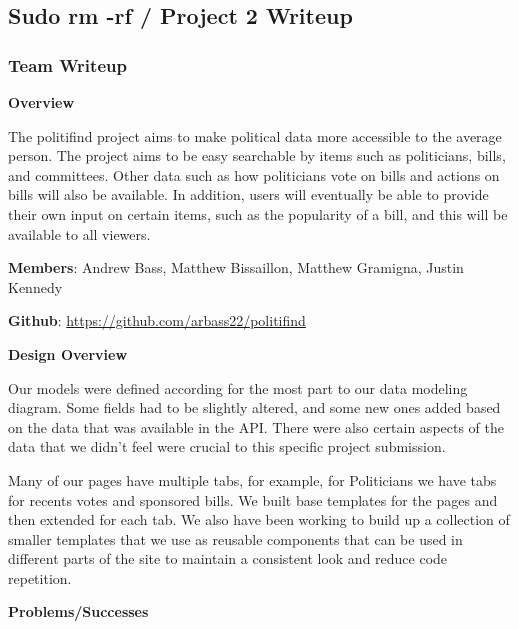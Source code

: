 \documentclass{article}
\newcommand{\n}{\noindent}
\begin{document}
\begin{center}
\subsection*{Sudo rm -rf / Project 2 Writeup}
\end{center}

\subsubsection*{Team Writeup}

\textbf{Overview}

The politifind project aims to make political data more accessible to the average person. The project aims to be easy searchable by items such as politicians, bills, and committees. Other data such as how politicians vote on bills and actions on bills will also be available. In addition, users will eventually be able to provide their own input on certain items, such as the popularity of a bill, and this will be available to all viewers.

\n\textbf{Members}: Andrew Bass, Matthew Bissaillon, Matthew Gramigna, Justin Kennedy

\n\textbf{Github}: \url{https://github.com/arbass22/politifind}

\n\textbf{Design Overview}

Our models were defined according for the most part to our data modeling diagram. Some fields had to be slightly altered, and some new ones added based on the data that was available in the API. There were also certain aspects of the data that we didn't feel were crucial to this specific project submission.

Many of our pages have multiple tabs, for example, for Politicians we have tabs for recents votes and sponsored bills.  We built base templates for the pages and then extended for each tab.  We also have been working to build up a collection of smaller templates that we use as reusable components that can be used in different parts of the site to maintain a consistent look and reduce code repetition.

\n\textbf{Problems/Successes}
\end{document}
